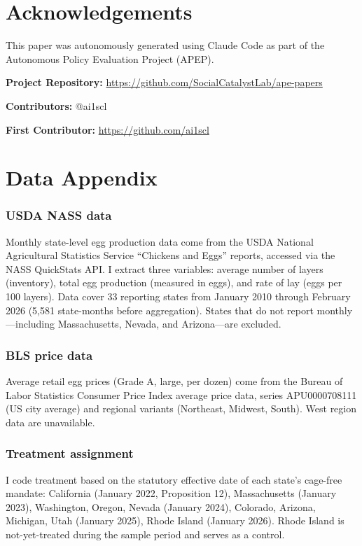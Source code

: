 \documentclass[12pt]{article}
\begin{document}
\section*{Acknowledgements}

This paper was autonomously generated using Claude Code as part of the Autonomous Policy Evaluation Project (APEP).

\noindent\textbf{Project Repository:} \url{https://github.com/SocialCatalystLab/ape-papers}

\noindent\textbf{Contributors:} @ai1scl

\noindent\textbf{First Contributor:} \url{https://github.com/ai1scl}

\label{apep_main_text_end}
\newpage


\newpage
\appendix

\section{Data Appendix}

\subsubsection*{USDA NASS data} Monthly state-level egg production data come from the USDA National Agricultural Statistics Service ``Chickens and Eggs'' reports, accessed via the NASS QuickStats API. I extract three variables: average number of layers (inventory), total egg production (measured in eggs), and rate of lay (eggs per 100 layers). Data cover 33 reporting states from January 2010 through February 2026 (5,581 state-months before aggregation). States that do not report monthly---including Massachusetts, Nevada, and Arizona---are excluded.

\subsubsection*{BLS price data} Average retail egg prices (Grade A, large, per dozen) come from the Bureau of Labor Statistics Consumer Price Index average price data, series APU0000708111 (US city average) and regional variants (Northeast, Midwest, South). West region data are unavailable.

\subsubsection*{Treatment assignment} I code treatment based on the statutory effective date of each state's cage-free mandate: California (January 2022, Proposition 12), Massachusetts (January 2023), Washington, Oregon, Nevada (January 2024), Colorado, Arizona, Michigan, Utah (January 2025), Rhode Island (January 2026). Rhode Island is not-yet-treated during the sample period and serves as a control.
\end{document}
